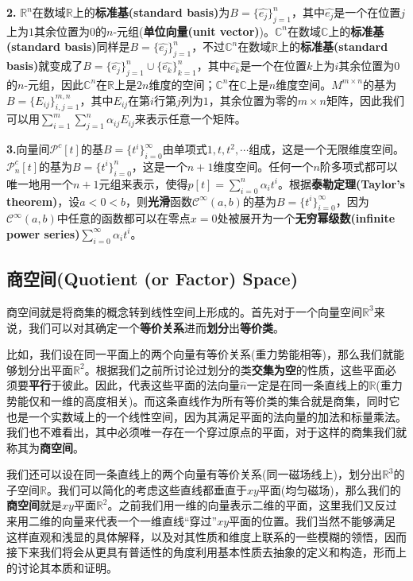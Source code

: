 \documentclass[mathserif,hyperref,UTF8,openany,b5paper]{ctexbook}
\begin{document}
 \textbf{2.} $\mathbb{R}^n$在数域$\mathbb{R}$上的\textbf{标准基(standard basis)}为$B = \{\hat{e_j}\}^n_{j=1}$，其中$\hat{e_j}$是一个在位置$j$上为$1$其余位置为$0$的$n$-元组(\textbf{单位向量(unit vector)})。$\mathbb{C}^n$在数域$\mathbb{C}$上的\textbf{标准基(standard basis)}同样是$B = \{\hat{e_j}\}^n_{j=1}$，不过$\mathbb{C}^n$在数域$\mathbb{R}$上的\textbf{标准基(standard basis)}就变成了$B = \{\hat{e_j}\}^n_{j=1}\cup\{\hat{e_k}\}^n_{k=1}$，其中$\hat{e_k}$是一个在位置$k$上为$i$其余位置为$0$的$n$-元组，因此$\mathbb{C}^n$在$\mathbb{R}$上是$2n$维度的空间；$\mathbb{C}^n$在$\mathbb{C}$上是$n$维度空间。$M^{m\times n}$的基为$B=\{E_{ij}\}^{m,n}_{i,j=1}$，其中$E_{ij}$在第$i$行第$j$列为$1$，其余位置为零的$m\times n$矩阵，因此我们可以用$\sum_{i=1}^m \sum_{j=1}^n \alpha_{ij} E_{ij}$来表示任意一个矩阵。

\textbf{3.}向量间$\mathcal{P}^c [t]$的基$B=\{t^i\}_{i=0}^\infty$由单项式$1,t,t^2,\cdots$组成，这是一个无限维度空间。$\mathcal{P}^c_n [t]$的基为$B=\{t^i\}_{i=0}^n$，这是一个$n+1$维度空间。任何一个$n$阶多项式都可以唯一地用一个$n+1$元组来表示，使得$p[t]=\sum^n_{i=0} \alpha_i t^i$。根据\textbf{泰勒定理(Taylor’s theorem)}，设$a<0<b$，则\textbf{光滑}函数$\mathcal{C}^\infty(a,b)$的基为$B=\{t^i\}_{i=0}^\infty$，因为$\mathcal{C}^\infty(a,b)$中任意的函数都可以在零点$x=0$处被展开为一个\textbf{无穷幂级数(infinite power series)}$\sum^\infty_{i=0} \alpha_i t^i$。

\subsection{商空间(Quotient (or Factor) Space)}
商空间就是将商集的概念转到线性空间上形成的。首先对于一个向量空间$\mathbb{R}^3$来说，我们可以对其确定一个\textbf{等价关系}进而\textbf{划分}出\textbf{等价类}。

比如，我们设在同一平面上的两个向量有等价关系(重力势能相等)，那么我们就能够划分出平面$\mathbb{R}^2$。根据我们之前所讨论过划分的类\textbf{交集为空}的性质，这些平面必须要\textbf{平行}于彼此。因此，代表这些平面的法向量$\hat{n}$一定是在同一条直线上的$\mathbb{R}$(重力势能仅和一维的高度相关)。而这条直线作为所有等价类的集合就是商集，同时它也是一个实数域上的一个线性空间，因为其满足平面的法向量的加法和标量乘法。我们也不难看出，其中必须唯一存在一个穿过原点的平面，对于这样的商集我们就称其为\textbf{商空间}。

我们还可以设在同一条直线上的两个向量有等价关系(同一磁场线上)，划分出$\mathbb{R}^3$的子空间$\mathbb{R}$。我们可以简化的考虑这些直线都垂直于$xy$平面(均匀磁场)，那么我们的\textbf{商空间}就是$xy$平面$\mathbb{R}^2$。之前我们用一维的向量表示二维的平面，这里我们又反过来用二维的向量来代表一个一维直线“穿过”$xy$平面的位置。我们当然不能够满足这样直观和浅显的具体解释，以及对其性质和维度上联系的一些模糊的领悟，因而接下来我们将会从更具有普适性的角度利用基本性质去抽象的定义和构造，形而上的讨论其本质和证明。
\end{document}
